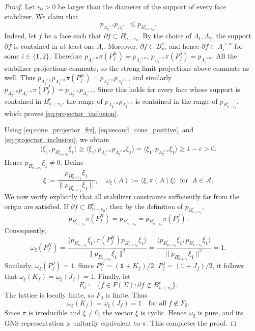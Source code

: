 \documentclass[a4paper,11pt]{article}
\theoremstyle{definition}
\theoremstyle{remark}
\theoremstyle{remark}
\begin{document}
\begin{proof}
    Let $r_0>0$ be larger than the diameter of the support of every face stabilizer. We claim that
    \begin{equation}\label{eq:projector_inclusion}
        p_{\Lambda_2^{>n}}p_{\Lambda_1^{>n}}
        \leq
        p_{B_{n+r_0}^c}.
    \end{equation}
    Indeed, let $f$ be a face such that $\partial f\subset B_{n+r_0}^c$. By the choice of $\Lambda_1,\Lambda_2$, the support $\partial f$ is contained in at least one $\Lambda_i$. Moreover, $\partial f\subset B_n^c$, and hence $\partial f\subset\Lambda_i^{>n}$ for some $i\in\{1,2\}$. Therefore $p_{\Lambda_i^{>n}}\pi(P_f^K)=p_{\Lambda_i^{>n}}$, $p_{\Lambda_i^{>n}}\pi(P_f^J)=p_{\Lambda_i^{>n}}$. All the stabilizer projections commute, so the strong limit projections above commute as well. Thus $p_{\Lambda_2^{>n}}p_{\Lambda_1^{>n}}\pi(P_f^K) = p_{\Lambda_2^{>n}}p_{\Lambda_1^{>n}}$, and similarly $p_{\Lambda_2^{>n}}p_{\Lambda_1^{>n}}\pi(P_f^J) = p_{\Lambda_2^{>n}}p_{\Lambda_1^{>n}}$. Since this holds for every face whose support is contained in $B_{n+r_0}^c$, the range of $p_{\Lambda_2^{>n}}p_{\Lambda_1^{>n}}$ is contained in the range of $p_{B_{n+r_0}^c}$, which proves
    \eqref{eq:projector_inclusion}.

    Using \eqref{eq:cone_projector_fix},
    \eqref{eq:second_cone_positive}, and
    \eqref{eq:projector_inclusion}, we obtain
    \begin{align*}
        \langle\xi_1,p_{B_{n+r_0}^c}\xi_1\rangle \geq \langle\xi_1, p_{\Lambda_2^{>n}}p_{\Lambda_1^{>n}}\xi_1\rangle = \langle\xi_1,p_{\Lambda_2^{>n}}\xi_1\rangle \geq 1-\varepsilon>0.
    \end{align*}
    Hence $p_{B_{n+r_0}^c}\xi_1\neq0$. Define
    \[
        \xi := \frac{p_{B_{n+r_0}^c}\xi_1}{\|p_{B_{n+r_0}^c}\xi_1\|},\quad \omega_\xi(A):=\langle \xi,\pi(A)\xi\rangle \;\; \text{for}\;\; A\in \mathcal{A}. 
    \]
    We now verify explicitly that all stabilizer constraints sufficiently far from the origin are satisfied. If
    $\partial f\subset B_{n+r_0}^c$, then by the definition of $p_{B_{n+r_0}^c}$,
    \[
        p_{B_{n+r_0}^c}\pi(P_f^K) = p_{B_{n+r_0}^c} = p_{B_{n+r_0}^c}\pi(P_f^J).
    \]
    Consequently,
    \[
        \omega_\xi(P_f^K) = \frac{\langle p_{B_{n+r_0}^c}\xi_1,\pi(P_f^K)p_{B_{n+r_0}^c}\xi_1\rangle}{\|p_{B_{n+r_0}^c}\xi_1\|^2} = \frac{\langle p_{B_{n+r_0}^c}\xi_1,p_{B_{n+r_0}^c}\xi_1\rangle}{\|p_{B_{n+r_0}^c}\xi_1\|^2}=1.
    \]
    Similarly, $\omega_\xi(P_f^J)=1$. Since $P_f^K={(\mathds{1}+K_f)}/{2}$, $P_f^J={(\mathds{1}+J_f)}/{2}$, it follows that $\omega_\xi(K_f)=\omega_\xi(J_f)=1$. 
    Finally, let
    \[
        F_0 := \{f\in F(\Sigma):\partial f\not\subset B_{n+r_0}^c\}.
    \]
    The lattice is locally finite, so $F_0$ is finite. Thus
    \[
        \omega_\xi(K_f)=\omega_\xi(J_f)=1
        \quad 
        \text{for all }f\notin F_0.
    \]
    Since $\pi$ is irreducible and $\xi\neq 0$, the vector $\xi$ is cyclic. Hence $\omega_\xi$ is pure, and its GNS representation is unitarily equivalent to $\pi$. This completes the proof.
\end{proof}
\end{document}
